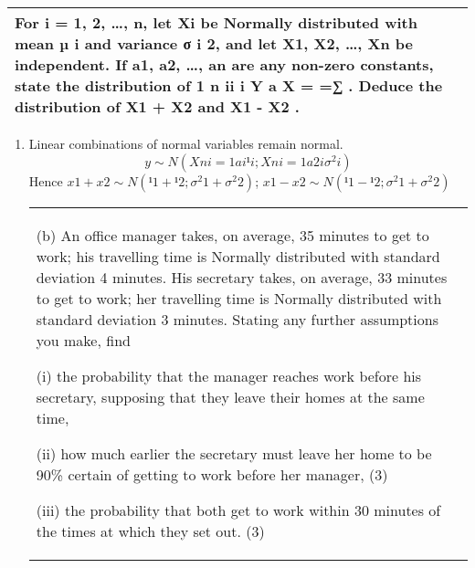 \documentclass[a4paper,12pt]{article}
\begin{document}
\begin{table}[ht!]
     \centering
     \begin{tabular}{|p{15cm}|}
     \hline        
For i = 1, 2, …, n, let Xi be Normally distributed with mean µ i and variance σ i 2, and let X1, X2, …, Xn be independent.  If a1, a2, …, an are any 
non-zero constants, state the distribution of 
1
n
ii
i Y a X = =∑ .  Deduce the 
distribution of X1 + X2 and X1 - X2 . 
 \\ \hline
      \end{tabular}
    \end{table}
    

    

\begin{enumerate}
    \item 
Linear combinations of normal variables remain normal.
\[
y \sim N(
Xn
i=1
ai¹i;
Xn
i=1
a2
i \sigma^2
i )\]
Hence $x1 + x2 \sim N(¹1 + ¹2; \sigma^2
1 + \sigma^2
2)$; $x1 - x2 \sim N(¹1 - ¹2; \sigma^2
1 + \sigma^2
2)$
\newpage
  \begin{table}[ht!]
     \centering
     \begin{tabular}{|p{15cm}|}
     \hline  
 
(b) An office manager takes, on average, 35 minutes to get to work;  his travelling time is Normally distributed with standard deviation 4 minutes.  His secretary takes, on average, 33 minutes to get to work;  her travelling time is Normally distributed with standard deviation 3 minutes.  Stating any further assumptions you make, find 
 
(i) the probability that the manager reaches work before his secretary, supposing that they leave their homes at the same time, 
 
(ii) how much earlier the secretary must leave her home to be 90\% certain of getting to work before her manager, (3) 
 
(iii) the probability that both get to work within 30 minutes of the times at which they set out. (3) 
 

\end{tabular}
\end{table}
\end{enumerate}
\end{document}

